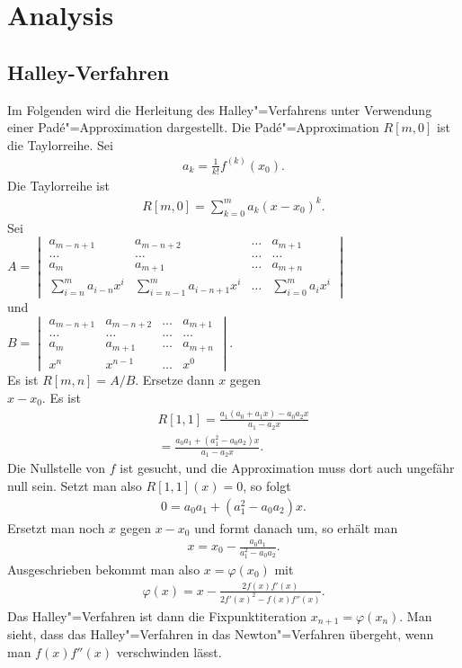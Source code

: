 \documentclass[a4paper,10pt,fleqn,twocolumn,twoside]{article}
\begin{document}
\section{Analysis}
\subsection{Halley-Verfahren}
Im Folgenden wird die Herleitung des Halley"=Verfahrens unter
Verwendung einer Padé"=Approximation dargestellt.
Die Padé"=Approximation \(R[m,0]\) ist die Taylorreihe. Sei
\begin{gather*}
a_k = \frac{1}{k!} f^{(k)}(x_0).
\end{gather*}
Die Taylorreihe ist
\begin{gather*}
R[m,0] = \sum_{k=0}^m a_k(x-x_0)^k.
\end{gather*}
Sei\\
\(A=\begin{vmatrix}
a_{m-n+1} & a_{m-n+2} & \ldots & a_{m+1}\\
\ldots & \ldots & \ldots & \ldots\\
a_m & a_{m+1} & \ldots & a_{m+n}\\
\sum\limits_{i=n}^m a_{i-n}x^i &
\sum\limits_{i=n-1}^m a_{i-n+1}x^i
&\ldots & \sum\limits_{i=0}^m a_i x^i
\end{vmatrix}\)\\
und\\
\(B=\begin{vmatrix}
a_{m-n+1} & a_{m-n+2} & \ldots & a_{m+1}\\
\ldots &\ldots &\ldots &\ldots\\
a_m & a_{m+1} &\ldots & a_{m+n}\\
x^n & x^{n-1} &\ldots & x^0
\end{vmatrix}\).\\
Es ist \(R[m,n]=A/B\).
Ersetze dann \(x\) gegen\\
\(x-x_0\). Es ist
\begin{gather*}
R[1,1] = \frac{a_1(a_0+a_1 x)-a_0a_2x}{a_1-a_2x}\\
= \frac{a_0a_1+(a_1^2-a_0a_2)x}{a_1-a_2x}.
\end{gather*}
Die Nullstelle von \(f\) ist gesucht, und die Approximation
muss dort auch ungefähr null sein. Setzt man also \(R[1,1](x)=0\),
so folgt
\begin{gather*}
0=a_0a_1+(a_1^2-a_0a_2)x.
\end{gather*}
Ersetzt man noch \(x\) gegen \(x-x_0\) und formt danach um,
so erhält man
\begin{gather*}
x=x_0-\frac{a_0a_1}{a_1^2-a_0a_2}.
\end{gather*}
Ausgeschrieben bekommt man also \(x=\varphi(x_0)\) mit
\begin{gather*}
\varphi(x) = x-\frac{2f(x)f'(x)}{2f'(x)^2-f(x)f''(x)}.
\end{gather*}
Das Halley"=Verfahren ist dann die Fixpunktiteration
\(x_{n+1}=\varphi(x_n)\).
Man sieht, dass das Halley"=Verfahren in das Newton"=Verfahren
übergeht, wenn man \(f(x)f''(x)\) verschwinden lässt.
\end{document}
